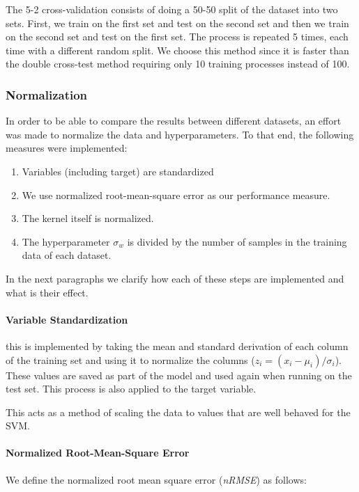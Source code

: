 The 5-2 cross-validation
consists of doing a 50-50 split of the dataset into two sets. First, we train on the first set and test on the second set
and then we train on the second set and test on the first set. The process is repeated 5 times, each time
with a different random split. We choose this method since it is faster than the double cross-test method
requiring only 10 training processes instead of 100.


\subsubsection{Normalization}

In order to be able to compare the results between different datasets, an effort
was made to normalize the data and hyperparameters. To that end, the
following measures were implemented:

\begin{enumerate}
    \item Variables (including target) are standardized
    \item We use normalized root-mean-square error as our performance
        measure.
    \item The kernel itself is normalized.
    \item The hyperparameter $\sigma_w$ is divided by the number of samples in
        the training data of each dataset.
\end{enumerate}

In the next paragraphs we clarify how each of these steps are implemented and
what is their effect.

\paragraph{Variable Standardization} this is implemented by taking the mean and
standard derivation of each column of the training set and using it to
normalize the columns ($z_i = (x_i - \mu_i)/\sigma_i$). These values are saved as
part of the model and used again when running on the test set. This process
is also applied to the target variable.

This acts as a method of scaling the data to values that are well behaved
for the SVM.

\paragraph{Normalized Root-Mean-Square Error} We define the
normalized root mean square error (\emph{nRMSE}) as follows:


